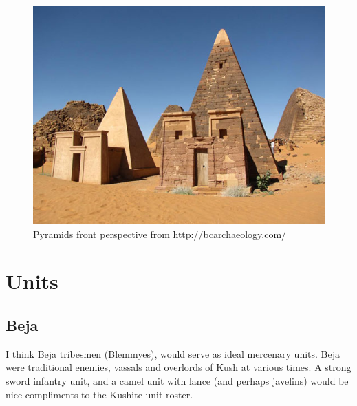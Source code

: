 \documentclass[a4paper,12pt]{scrreprt}
\begin{document}
\begin{figure}[H]
	\centering
	\includegraphics[width=\textwidth]{img/wonder/meroe-pyramids}
	\caption{Pyramids front perspective from \url{http://bcarchaeology.com/}}
\end{figure}

\section{Units}

\subsection{Beja}

I think Beja tribesmen (Blemmyes), would serve as ideal mercenary units. Beja were traditional enemies, vassals and overlords of Kush at various times. A strong sword infantry unit, and a camel unit with lance (and perhaps javelins) would be nice compliments to the Kushite unit roster.
\end{document}
